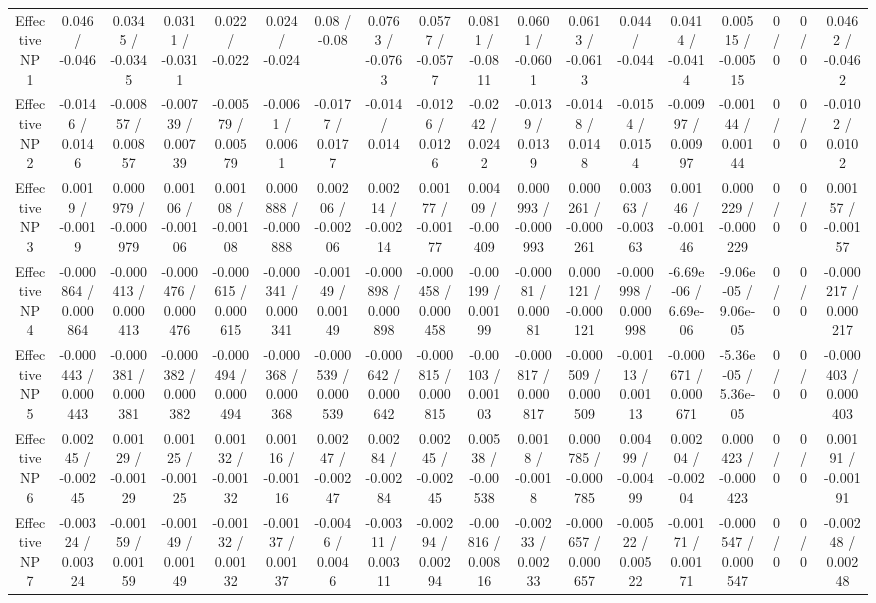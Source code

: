 \documentclass[10pt]{article}
\begin{document}
\begin{table}[htbp]
\begin{center}
\begin{tabular}{|c|c|c|c|c|c|c|c|c|c|c|c|c|c|c|c|c|c|}
  Effective NP 1 & 0.046 / -0.046 & 0.0345 / -0.0345 & 0.0311 / -0.0311 & 0.022 / -0.022 & 0.024 / -0.024 & 0.08 / -0.08 & 0.0763 / -0.0763 & 0.0577 / -0.0577 & 0.0811 / -0.0811 & 0.0601 / -0.0601 & 0.0613 / -0.0613 & 0.044 / -0.044 & 0.0414 / -0.0414 & 0.00515 / -0.00515 & 0 / 0 & 0 / 0 & 0.0462 / -0.0462 \\ 
  Effective NP 2 & -0.0146 / 0.0146 & -0.00857 / 0.00857 & -0.00739 / 0.00739 & -0.00579 / 0.00579 & -0.0061 / 0.0061 & -0.0177 / 0.0177 & -0.014 / 0.014 & -0.0126 / 0.0126 & -0.0242 / 0.0242 & -0.0139 / 0.0139 & -0.0148 / 0.0148 & -0.0154 / 0.0154 & -0.00997 / 0.00997 & -0.00144 / 0.00144 & 0 / 0 & 0 / 0 & -0.0102 / 0.0102 \\ 
  Effective NP 3 & 0.0019 / -0.0019 & 0.000979 / -0.000979 & 0.00106 / -0.00106 & 0.00108 / -0.00108 & 0.000888 / -0.000888 & 0.00206 / -0.00206 & 0.00214 / -0.00214 & 0.00177 / -0.00177 & 0.00409 / -0.00409 & 0.000993 / -0.000993 & 0.000261 / -0.000261 & 0.00363 / -0.00363 & 0.00146 / -0.00146 & 0.000229 / -0.000229 & 0 / 0 & 0 / 0 & 0.00157 / -0.00157 \\ 
  Effective NP 4 & -0.000864 / 0.000864 & -0.000413 / 0.000413 & -0.000476 / 0.000476 & -0.000615 / 0.000615 & -0.000341 / 0.000341 & -0.00149 / 0.00149 & -0.000898 / 0.000898 & -0.000458 / 0.000458 & -0.00199 / 0.00199 & -0.00081 / 0.00081 & 0.000121 / -0.000121 & -0.000998 / 0.000998 & -6.69e-06 / 6.69e-06 & -9.06e-05 / 9.06e-05 & 0 / 0 & 0 / 0 & -0.000217 / 0.000217 \\ 
  Effective NP 5 & -0.000443 / 0.000443 & -0.000381 / 0.000381 & -0.000382 / 0.000382 & -0.000494 / 0.000494 & -0.000368 / 0.000368 & -0.000539 / 0.000539 & -0.000642 / 0.000642 & -0.000815 / 0.000815 & -0.00103 / 0.00103 & -0.000817 / 0.000817 & -0.000509 / 0.000509 & -0.00113 / 0.00113 & -0.000671 / 0.000671 & -5.36e-05 / 5.36e-05 & 0 / 0 & 0 / 0 & -0.000403 / 0.000403 \\ 
  Effective NP 6 & 0.00245 / -0.00245 & 0.00129 / -0.00129 & 0.00125 / -0.00125 & 0.00132 / -0.00132 & 0.00116 / -0.00116 & 0.00247 / -0.00247 & 0.00284 / -0.00284 & 0.00245 / -0.00245 & 0.00538 / -0.00538 & 0.0018 / -0.0018 & 0.000785 / -0.000785 & 0.00499 / -0.00499 & 0.00204 / -0.00204 & 0.000423 / -0.000423 & 0 / 0 & 0 / 0 & 0.00191 / -0.00191 \\ 
  Effective NP 7 & -0.00324 / 0.00324 & -0.00159 / 0.00159 & -0.00149 / 0.00149 & -0.00132 / 0.00132 & -0.00137 / 0.00137 & -0.0046 / 0.0046 & -0.00311 / 0.00311 & -0.00294 / 0.00294 & -0.00816 / 0.00816 & -0.00233 / 0.00233 & -0.000657 / 0.000657 & -0.00522 / 0.00522 & -0.00171 / 0.00171 & -0.000547 / 0.000547 & 0 / 0 & 0 / 0 & -0.00248 / 0.00248 \\ 

\end{tabular}
\end{center}
\end{table}
\end{document}
